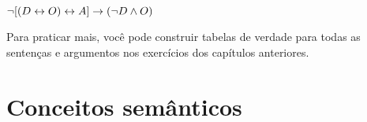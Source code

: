 \begin{earg}
%	


\item	$\neg [(D \leftrightarrow O) \leftrightarrow A] \rightarrow (\neg D \wedge O) $

\end{earg}

Para praticar mais, você pode construir tabelas de verdade para todas as sentenças e argumentos nos exercícios dos capítulos anteriores.


\chapter{Conceitos semânticos}
\label{s:SemanticConcepts}

